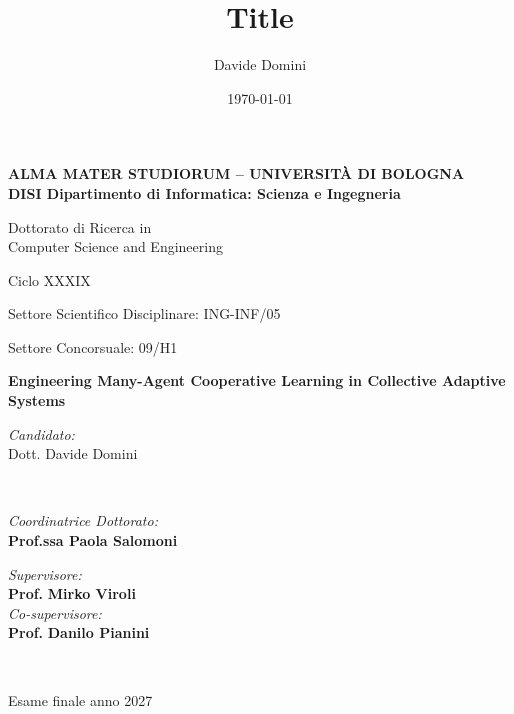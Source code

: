 \title{Title}
\author{Davide Domini}
\date{\today}

\begin{titlepage}
	\begin{center}

		\large
		\textbf{ALMA MATER STUDIORUM -- UNIVERSITÀ DI BOLOGNA \\ DISI Dipartimento di Informatica: Scienza e Ingegneria}
		\\
		\noindent\hrulefill
		\vspace{0.4cm}

		\Large
		Dottorato di Ricerca in \\
		Computer Science and Engineering

		\vspace{0.4cm}

		Ciclo XXXIX

		\vspace{0.4cm}

		Settore Scientifico Disciplinare: ING-INF/05

		Settore Concorsuale: 09/H1

		\Huge
		\vspace{3cm}
		\textbf{
			Engineering Many-Agent Cooperative Learning in Collective Adaptive Systems
		}

		{\Large{
		\vspace{3cm}

		\textit{Candidato:\\}
		\centering
		Dott. Davide Domini}
		\\}
		\large
		\vspace{2.5cm}
		\begin{minipage}[t]{0.64\textwidth}
			\begin{flushleft}
				\textit{Coordinatrice Dottorato:}
				\\
				\textbf{Prof.ssa Paola Salomoni}
			\end{flushleft}
		\end{minipage}
		\begin{minipage}[t]{0.34\textwidth}
			\begin{flushright}
				\textit{Supervisore:}
				\\
				\textbf{Prof.} \textbf{Mirko Viroli}
				\\
				\vspace{0.4cm}
				\textit{Co-supervisore:}
				\\
				\textbf{Prof.} \textbf{Danilo Pianini}
			\end{flushright}

		\end{minipage}\\

		\vfill
		\noindent\hrulefill
		\vspace{0.3cm}
		\Large

		Esame finale anno 2027
	\end{center}
\end{titlepage}
\restoregeometry